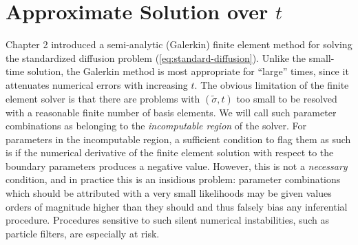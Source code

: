 \section{Approximate Solution over $t$} \label{sec:modes}
Chapter 2 introduced a semi-analytic (Galerkin) finite element method
for solving the standardized diffusion problem
(\ref{eq:standard-diffusion}). Unlike the small-time solution, the
Galerkin method is most appropriate for ``large'' times, since it
attenuates numerical errors with increasing $t$. The obvious
limitation of the finite element solver is that there are problems
with $(\tilde{\sigma}, t)$ too small to be resolved with a reasonable
finite number of basis elements. We will call such parameter
combinations as belonging to the \textit{incomputable region} of the
solver. For parameters in the incomputable region, a sufficient
condition to flag them as such is if the numerical derivative of the
finite element solution with respect to the boundary parameters
produces a negative value. However, this is not a \textit{necessary}
condition, and in practice this is an insidious problem: parameter
combinations which should be attributed with a very small likelihoods
may be given values orders of magnitude higher than they should and
thus falsely bias any inferential procedure. Procedures sensitive to
such silent numerical instabilities, such as particle filters, are
especially at risk.

